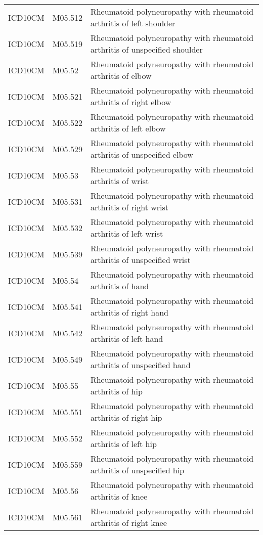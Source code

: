 \begin{table}[ht]
\begin{tabular}{lll}
  ICD10CM & M05.512 & Rheumatoid polyneuropathy with rheumatoid arthritis of left shoulder \\ 
  ICD10CM & M05.519 & Rheumatoid polyneuropathy with rheumatoid arthritis of unspecified shoulder \\ 
  ICD10CM & M05.52 & Rheumatoid polyneuropathy with rheumatoid arthritis of elbow \\ 
  ICD10CM & M05.521 & Rheumatoid polyneuropathy with rheumatoid arthritis of right elbow \\ 
  ICD10CM & M05.522 & Rheumatoid polyneuropathy with rheumatoid arthritis of left elbow \\ 
  ICD10CM & M05.529 & Rheumatoid polyneuropathy with rheumatoid arthritis of unspecified elbow \\ 
  ICD10CM & M05.53 & Rheumatoid polyneuropathy with rheumatoid arthritis of wrist \\ 
  ICD10CM & M05.531 & Rheumatoid polyneuropathy with rheumatoid arthritis of right wrist \\ 
  ICD10CM & M05.532 & Rheumatoid polyneuropathy with rheumatoid arthritis of left wrist \\ 
  ICD10CM & M05.539 & Rheumatoid polyneuropathy with rheumatoid arthritis of unspecified wrist \\ 
  ICD10CM & M05.54 & Rheumatoid polyneuropathy with rheumatoid arthritis of hand \\ 
  ICD10CM & M05.541 & Rheumatoid polyneuropathy with rheumatoid arthritis of right hand \\ 
  ICD10CM & M05.542 & Rheumatoid polyneuropathy with rheumatoid arthritis of left hand \\ 
  ICD10CM & M05.549 & Rheumatoid polyneuropathy with rheumatoid arthritis of unspecified hand \\ 
  ICD10CM & M05.55 & Rheumatoid polyneuropathy with rheumatoid arthritis of hip \\ 
  ICD10CM & M05.551 & Rheumatoid polyneuropathy with rheumatoid arthritis of right hip \\ 
  ICD10CM & M05.552 & Rheumatoid polyneuropathy with rheumatoid arthritis of left hip \\ 
  ICD10CM & M05.559 & Rheumatoid polyneuropathy with rheumatoid arthritis of unspecified hip \\ 
  ICD10CM & M05.56 & Rheumatoid polyneuropathy with rheumatoid arthritis of knee \\ 
  ICD10CM & M05.561 & Rheumatoid polyneuropathy with rheumatoid arthritis of right knee \\ 

\end{tabular}
\end{table}
